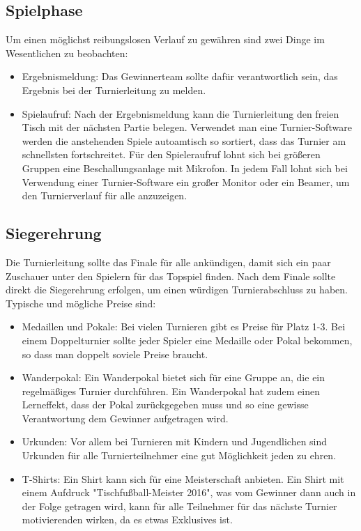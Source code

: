 \subsection{Spielphase}
\label{turniere:durchfuehrung:turnierphase}

Um einen möglichst reibungslosen Verlauf zu gewähren sind zwei Dinge im Wesentlichen zu beobachten:
\begin{itemize}
\item Ergebnismeldung: Das Gewinnerteam sollte dafür verantwortlich sein, das Ergebnis bei der Turnierleitung zu melden. 
\item Spielaufruf: Nach der Ergebnismeldung kann die Turnierleitung den freien Tisch mit der nächsten Partie belegen. 
Verwendet man eine Turnier-Software werden die anstehenden Spiele autoamtisch so sortiert, dass das Turnier am schnellsten fortschreitet.
Für den Spieleraufruf lohnt sich bei größeren Gruppen eine Beschallungsanlage mit Mikrofon. 
In jedem Fall lohnt sich bei Verwendung einer Turnier-Software ein großer Monitor oder ein Beamer, um den Turnierverlauf für alle anzuzeigen.
\end{itemize}


\subsection{Siegerehrung}
\label{turniere:durchfuehrung:siegerehrung}

Die Turnierleitung sollte das Finale für alle ankündigen, damit sich ein paar Zuschauer unter den Spielern für das Topspiel finden. 
Nach dem Finale sollte direkt die Siegerehrung erfolgen, um einen würdigen Turnierabschluss zu haben.
Typische und mögliche Preise sind:
\begin{itemize}
\item Medaillen und Pokale: Bei vielen Turnieren gibt es Preise für Platz 1-3. Bei einem Doppelturnier sollte jeder Spieler eine Medaille oder Pokal bekommen, so dass man doppelt soviele Preise braucht.
\item Wanderpokal: Ein Wanderpokal bietet sich für eine Gruppe an, die ein regelmäßiges Turnier durchführen. Ein Wanderpokal hat zudem einen Lerneffekt, dass der Pokal zurückgegeben muss und so eine gewisse Verantwortung dem Gewinner aufgetragen wird.
\item Urkunden: Vor allem bei Turnieren mit Kindern und Jugendlichen sind Urkunden für alle Turnierteilnehmer eine gut Möglichkeit jeden zu ehren.
\item T-Shirts: Ein Shirt kann sich für eine Meisterschaft anbieten. Ein Shirt mit einem Aufdruck "Tischfußball-Meister 2016", was vom Gewinner dann auch in der Folge getragen wird, kann für alle Teilnehmer für das nächste Turnier motivierenden wirken, da es etwas Exklusives ist.
\end{itemize}



